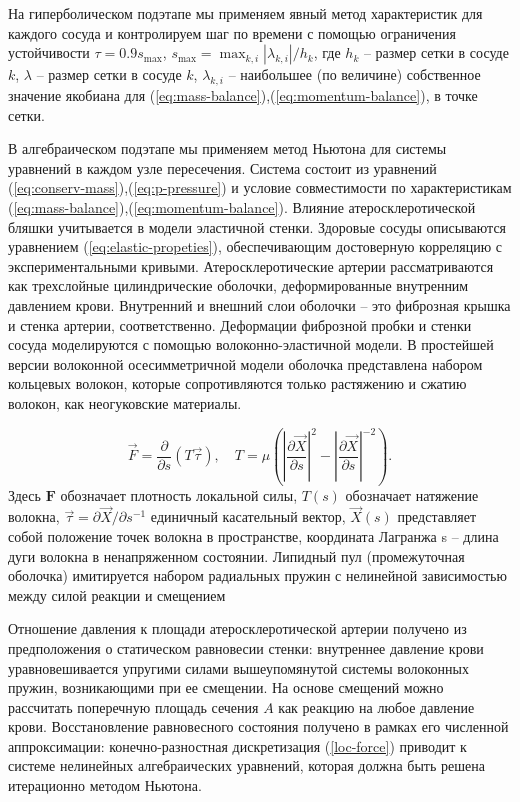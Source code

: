 На гиперболическом подэтапе мы применяем явный метод характеристик для каждого сосуда и контролируем шаг по времени с помощью 
ограничения устойчивости $\tau = 0.9 s_{\max}$, $s_{\max}=\max_{k,i}|\lambda _{k,i}|/h_k$, где $h_k$ -- размер сетки в сосуде $k$, 
$\lambda$ -- размер сетки в сосуде $k$,  $\lambda _{k,i}$ -- наибольшее (по величине) собственное значение якобиана для  (\ref{eq:mass-balance}),(\ref{eq:momentum-balance}), 
 в точке сетки.

В алгебраическом подэтапе мы применяем метод Ньютона для системы уравнений в каждом узле пересечения. 
Система состоит из уравнений (\ref{eq:conserv-mass}),(\ref{eq:p-pressure}) и условие совместимости по характеристикам (\ref{eq:mass-balance}),(\ref{eq:momentum-balance}). 
Влияние атеросклеротической бляшки учитывается в модели эластичной стенки. Здоровые сосуды описываются уравнением (\ref{eq:elastic-propeties}), 
обеспечивающим достоверную корреляцию с экспериментальными кривыми. Атеросклеротические артерии рассматриваются как 
трехслойные цилиндрические оболочки, деформированные внутренним давлением крови. Внутренний и внешний слои оболочки -- это 
фиброзная крышка и стенка артерии, соответственно. Деформации фиброзной пробки и стенки сосуда моделируются с помощью 
волоконно-эластичной модели. В простейшей версии волоконной осесимметричной модели оболочка представлена набором кольцевых волокон, 
которые сопротивляются только растяжению и сжатию волокон, как неогуковские материалы.

\begin{equation}
    \label{loc-force}
    \vec{F}=\frac{\partial}{\partial s}(T\vec{\tau}),
    \quad
    T=\mu\left(\left|\frac{\partial \vec{X}}{\partial s}\right|^2-\left|\frac{\partial \Vec{X}}{\partial s}\right|^{-2}\right).
\end{equation}
Здесь $\mathbf{F}$ обозначает плотность локальной силы, $T(s)$ обозначает натяжение волокна, 
$\Vec{\tau} =\partial \Vec{X}/\partial s^{-1}$ единичный касательный вектор, $\Vec{X}(s)$ 
представляет собой положение точек волокна в пространстве, координата Лагранжа s -- длина дуги волокна в ненапряженном состоянии. 
Липидный пул (промежуточная оболочка) имитируется набором радиальных пружин с нелинейной зависимостью между силой реакции и смещением

Отношение давления к площади атеросклеротической артерии получено из предположения о статическом равновесии стенки: 
внутреннее давление крови уравновешивается упругими силами вышеупомянутой системы волоконных пружин, возникающими при ее смещении. 
На основе смещений можно рассчитать поперечную площадь сечения $A$ как реакцию на любое давление крови. 
Восстановление равновесного состояния получено в рамках его численной аппроксимации: конечно-разностная дискретизация (\ref{loc-force}) 
приводит к системе нелинейных алгебраических уравнений, которая должна быть решена итерационно методом Ньютона.

